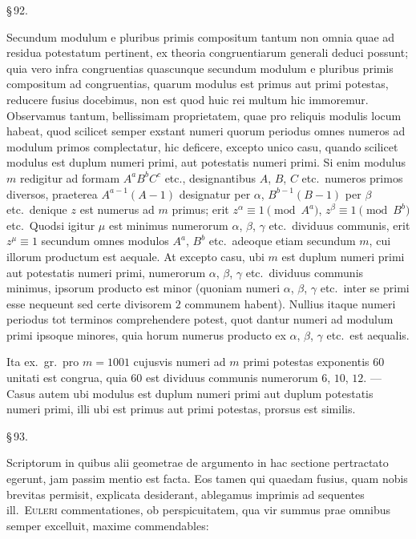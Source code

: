 \documentclass[12pt,a4paper]{article}
\theoremstyle{plain}
\theoremstyle{definition}
\theoremstyle{remark}
\begin{document}
\begin{center}\S\,92.\end{center}

Secundum modulum e pluribus primis compositum tantum non omnia quae ad residua potestatum pertinent, ex theoria congruentiarum generali deduci possunt; quia vero infra congruentias quascunque secundum modulum e pluribus primis compositum ad congruentias, quarum modulus est primus aut primi potestas, reducere fusius docebimus, non est quod huic rei multum hic immoremur. Observamus tantum, bellissimam proprietatem, quae pro reliquis modulis locum habeat, quod scilicet semper exstant numeri quorum periodus omnes numeros ad modulum primos complectatur, hic deficere, excepto unico casu, quando scilicet modulus est duplum numeri primi, aut potestatis numeri primi. Si enim modulus $m$ redigitur ad formam $A^a B^b C^c$ etc., designantibus $A$, $B$, $C$ etc.\ numeros primos diversos, praeterea $A^{a-1}(A-1)$ designatur per $\alpha$, $B^{b-1}(B-1)$ per $\beta$ etc.\ denique $z$ est numerus ad $m$ primus; erit $z^\alpha \equiv 1 \pmod{A^a}$, $z^\beta \equiv 1 \pmod{B^b}$ etc.\ Quodsi igitur $\mu$ est minimus numerorum $\alpha$, $\beta$, $\gamma$ etc.\ dividuus communis, erit $z^\mu \equiv 1$ secundum omnes modulos $A^a$, $B^b$ etc.\ adeoque etiam secundum $m$, cui illorum productum est aequale. At excepto casu, ubi $m$ est duplum numeri primi aut potestatis numeri primi, numerorum $\alpha$, $\beta$, $\gamma$ etc.\ dividuus communis minimus, ipsorum producto est minor (quoniam numeri $\alpha$, $\beta$, $\gamma$ etc.\ inter se primi esse nequeunt sed certe divisorem $2$ communem habent). Nullius itaque numeri periodus tot terminos comprehendere potest, quot dantur numeri ad modulum primi ipsoque minores, quia horum numerus producto ex $\alpha$, $\beta$, $\gamma$ etc.\ est aequalis.

Ita ex.\ gr.\ pro $m = 1001$ cujusvis numeri ad $m$ primi potestas exponentis $60$ unitati est congrua, quia $60$ est dividuus communis numerorum $6$, $10$, $12$. --- Casus autem ubi modulus est duplum numeri primi aut duplum potestatis numeri primi, illi ubi est primus aut primi potestas, prorsus est similis.

\begin{center}\S\,93.\end{center}

Scriptorum in quibus alii geometrae de argumento in hac sectione pertractato egerunt, jam passim mentio est facta. Eos tamen qui quaedam fusius, quam nobis brevitas permisit, explicata desiderant, ablegamus imprimis ad sequentes ill.\ \textsc{Euleri} commentationes, ob perspicuitatem, qua vir summus prae omnibus semper excelluit, maxime commendables:
\end{document}
